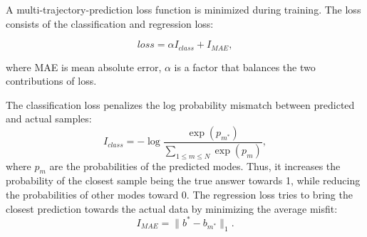 
A multi-trajectory-prediction loss function is minimized during training. The loss consists of the classification and regression loss:

\begin{equation}
    loss = \alpha I_{class} + I_{MAE},
\end{equation}

where  MAE is mean absolute error, $\alpha$ is a factor that balances the two contributions of loss.

The classification loss penalizes the log probability mismatch between predicted and actual samples:
\begin{equation}
    I_{class} = -\log 
    \frac{\exp (p_{m^*})}
    {\sum\limits_{1 \leq m \leq N}\exp (p_{m})},
\end{equation}
where $p_m$ are the probabilities of the predicted modes.
Thus, it increases the probability of the closest sample being the true answer towards 1, while reducing the probabilities of other modes toward 0.
The regression loss tries to bring the closest prediction towards the actual data by minimizing the average misfit:
\begin{equation}
    I_{MAE} = \lVert b^* - b_{m^*} \rVert_1.
\end{equation}
